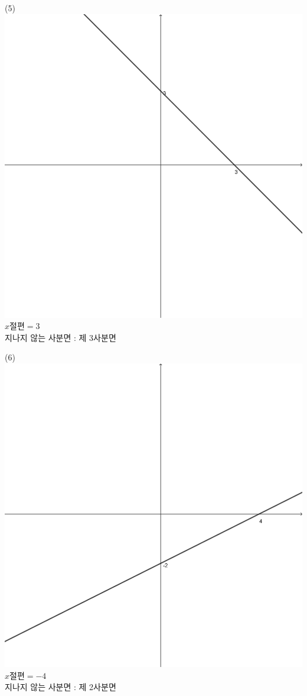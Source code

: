 \documentclass{article}
\begin{document}
\par\bigskip
\noindent
\begin{minipage}{0.3\textwidth}
    \centering
    (5)
    \includegraphics[width=\textwidth]{graph_5.png}\\
    $x\text{절편}=3$\\
    지나지 않는 사분면 : 제 3사분면
\end{minipage}
\begin{minipage}{0.3\textwidth}
    \centering
    (6)
    \includegraphics[width=\textwidth]{graph_6.png}\\
    $x\text{절편}=-4$\\
    지나지 않는 사분면 : 제 2사분면
\end{minipage}
\end{document}
